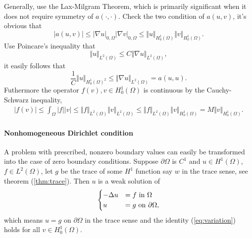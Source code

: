 \documentclass[11pt,letterpaper]{article}
\begin{document}
Generally, use the Lax-Milgram Theorem,
which is primarily significant when it does not require symmetry of $a(\cdot, \cdot)$.
Check the two condition of $a(u,v)$,
it's obvious that
\begin{displaymath}
  |a(u,v)|\leq |\nabla u|_{0,\Omega}|\nabla v|_{0,\Omega}\leq \Vert u\Vert_{H^1_0(\Omega)}\Vert v\Vert_{H^1_0(\Omega)}.
\end{displaymath}
Use Poincare's inequality that
\begin{displaymath}
  \Vert u\Vert_{L^2(\Omega)} \leq C \Vert \nabla u\Vert_{L^2(\Omega)},
\end{displaymath}
it easily follows that
\begin{displaymath}
  \frac{1}{C}\Vert u\Vert_{H^1_0(\Omega)^2}\leq \Vert \nabla u\Vert_{L^2(\Omega)} = a(u,u).
\end{displaymath}
Futhermore the operator $f(v), v\in H_0^1(\Omega)$ is continuous by the Cauchy-Schwarz inequality,
\begin{displaymath}
  \begin{aligned}
    |f(v)|\leq \int_\Omega|f||v|\leq \Vert f\Vert_{L^2(\Omega)}\Vert v\Vert_{L^2(\Omega)}
    \leq \Vert f\Vert_{L^2(\Omega)}\Vert v\Vert_{H^1_0(\Omega)}=M\Vert v\Vert_{H^1_0(\Omega)}.
  \end{aligned}
\end{displaymath}


\paragraph{Nonhomogeneous Dirichlet condition}

A problem with prescribed, nonzero boundary values can easily be transformed into
the case of zero boundary conditions.
Suppose $\partial \Omega$ is $C^1$ and $u\in H^1(\Omega)$, $f\in L^2(\Omega)$,
let $g$ be the trace of some $H^1$ function say $w$ in the trace sense,
see theorem (\ref{thm:trace}).
Then $u$ is a weak solution of 
\begin{equation}
  \label{eq:nonhomo}
  \begin{cases}
    -\Delta u&= f\textmd{ in }\Omega\\
    u&=g\textmd{ on }\partial \Omega,
  \end{cases}
\end{equation}
which means $u=g$ on $\partial \Omega$ in the trace sense and
the identity (\ref{eq:variation}) holds for all $v\in H^1_0(\Omega)$.
\end{document}

